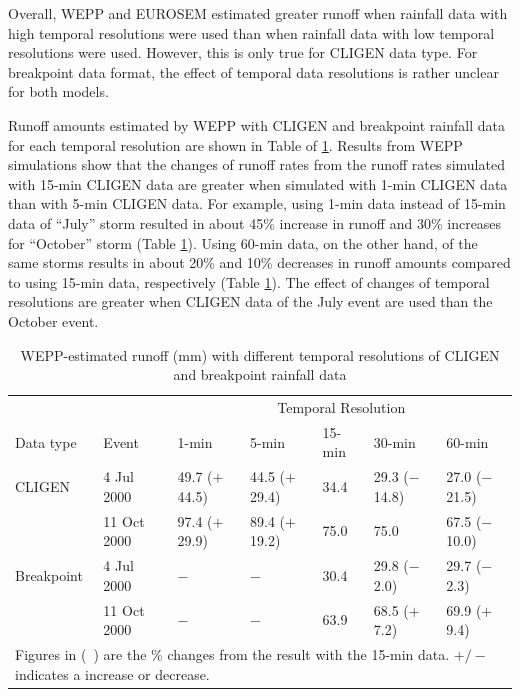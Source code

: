 Overall, WEPP and EUROSEM estimated greater runoff when rainfall data with high
temporal resolutions were used than when rainfall data with low temporal
resolutions were used. However, this is only true for CLIGEN data type. For
breakpoint data format, the effect of temporal data resolutions is rather
unclear for both models.

Runoff amounts estimated by WEPP with CLIGEN and breakpoint rainfall data for
each temporal resolution are shown in Table of
\ref{tab:DifferentTemporalScalesOfRainfallDataOnWEPPRunoffEstimation}. Results
from WEPP simulations show that the changes of runoff rates from the runoff
rates simulated with 15-min CLIGEN data are greater when simulated with 1-min
CLIGEN data than with 5-min CLIGEN data. For example, using 1-min data instead
of 15-min data of ``July'' storm resulted in about 45\% increase in runoff and
30\% increases for ``October'' storm (Table
\ref{tab:DifferentTemporalScalesOfRainfallDataOnWEPPRunoffEstimation}). Using
60-min data, on the other hand, of the same storms results in about 20\% and
10\% decreases in runoff amounts compared to using 15-min data, respectively
(Table \ref{tab:DifferentTemporalScalesOfRainfallDataOnWEPPRunoffEstimation}).
The effect of changes of temporal resolutions are greater when CLIGEN data of
the
July event are used than the October event.

\begin{table}[htbp]
  \centering
  \footnotesize
  \caption[WEPP-estimated runoff with different temporal resolutions of CLIGEN
and breakpoint rainfall data]{WEPP-estimated runoff (mm) with different temporal
resolutions of CLIGEN and breakpoint rainfall data}
  \label{tab:DifferentTemporalScalesOfRainfallDataOnWEPPRunoffEstimation}
    \begin{tabular}{lllllll}
      \toprule
      & & \multicolumn{5}{c}{Temporal Resolution}\\
      \cmidrule{3-7}
      Data type & Event & 1-min & 5-min & 15-min & 30-min & 60-min \\
      \midrule
      CLIGEN & 4 Jul 2000 & 49.7 ($+$44.5) & 44.5 ($+$29.4) & 34.4 & 29.3
($-$14.8) & 27.0 ($-$21.5) \\
       & 11 Oct 2000 & 97.4 ($+$29.9) & 89.4 ($+$19.2) & 75.0 & 75.0 & 67.5
($-$10.0) \\
       \midrule
      Breakpoint & 4 Jul 2000 & $-$ & $-$ & 30.4 & 29.8 ($-$2.0) & 29.7
($-$2.3)\\
       & 11 Oct 2000 & $-$ & $-$ & 63.9 & 68.5 ($+$7.2) & 69.9 ($+$9.4)\\
      \bottomrule
      \multicolumn{7}{p{12cm}}{\footnotesize Figures in (\ ) are the \% changes
from the result with the 15-min data. $+/-$ indicates a increase or decrease.}\\
    \end{tabular}
\end{table}

